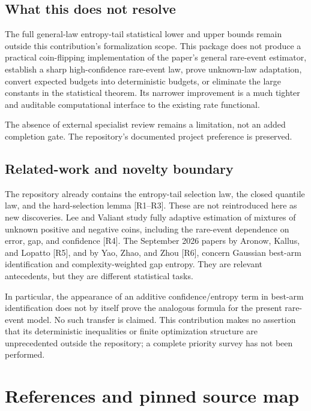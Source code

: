 \documentclass[
  11pt,
  a4paper,
]{article}
\begin{document}
\subsection{What this does not
resolve}\label{what-this-does-not-resolve}

The full general-law entropy-tail statistical lower and upper bounds
remain outside this contribution's formalization scope. This package
does not produce a practical coin-flipping implementation of the paper's
general rare-event estimator, establish a sharp high-confidence
rare-event law, prove unknown-law adaptation, convert expected budgets
into deterministic budgets, or eliminate the large constants in the
statistical theorem. Its narrower improvement is a much tighter and
auditable computational interface to the existing rate functional.

The absence of external specialist review remains a limitation, not an
added completion gate. The repository's documented project preference is
preserved.

\subsection{Related-work and novelty
boundary}\label{related-work-and-novelty-boundary}

The repository already contains the entropy-tail selection law, the
closed quantile law, and the hard-selection lemma {[}R1--R3{]}. These
are not reintroduced here as new discoveries. Lee and Valiant study
fully adaptive estimation of mixtures of unknown positive and negative
coins, including the rare-event dependence on error, gap, and confidence
{[}R4{]}. The September 2026 papers by Aronow, Kallus, and Lopatto
{[}R5{]}, and by Yao, Zhao, and Zhou {[}R6{]}, concern Gaussian best-arm
identification and complexity-weighted gap entropy. They are relevant
antecedents, but they are different statistical tasks.

In particular, the appearance of an additive confidence/entropy term in
best-arm identification does not by itself prove the analogous formula
for the present rare-event model. No such transfer is claimed. This
contribution makes no assertion that its deterministic inequalities or
finite optimization structure are unprecedented outside the repository;
a complete priority survey has not been performed.

\section{References and pinned source
map}\label{references-and-pinned-source-map}
\end{document}
